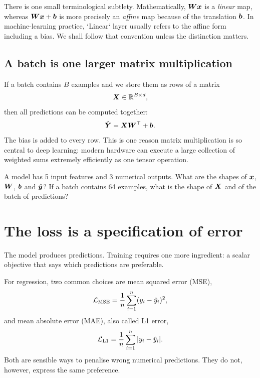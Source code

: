 There is one small terminological subtlety. Mathematically, \(\bm{W}\bm{x}\) is a \emph{linear} map, whereas \(\bm{W}\bm{x}+\bm{b}\) is more precisely an \emph{affine} map because of the translation \(\bm{b}\). In machine-learning practice, `Linear` layer usually refers to the affine form including a bias. We shall follow that convention unless the distinction matters.

\subsection{A batch is one larger matrix multiplication}

If a batch contains \(B\) examples and we store them as rows of a matrix
\[
  \bm{X}\in\mathbb{R}^{B\times d},
\]
then all predictions can be computed together:
\begin{equation}
  \hat{\bm{Y}} = \bm{X}\bm{W}^{\top}+\bm{b}.
  \label{eq:week2-batch-matmul}
\end{equation}
The bias is added to every row. This is one reason matrix multiplication is so central to deep learning: modern hardware can execute a large collection of weighted sums extremely efficiently as one tensor operation.

\begin{checkpointbox}
A model has 5 input features and 3 numerical outputs. What are the shapes of \(\bm{x}\), \(\bm{W}\), \(\bm{b}\) and \(\hat{\bm{y}}\)? If a batch contains 64 examples, what is the shape of \(\bm{X}\) and of the batch of predictions?
\end{checkpointbox}

\section{The loss is a specification of error}

The model produces predictions. Training requires one more ingredient: a scalar objective that says which predictions are preferable.

For regression, two common choices are mean squared error (MSE),
\begin{equation}
  \mathcal{L}_{\mathrm{MSE}}
  = \frac{1}{n}\sum_{i=1}^{n}(y_i-\hat y_i)^2,
  \label{eq:week2-mse}
\end{equation}
and mean absolute error (MAE), also called L1 error,
\begin{equation}
  \mathcal{L}_{\mathrm{L1}}
  = \frac{1}{n}\sum_{i=1}^{n}|y_i-\hat y_i|.
  \label{eq:week2-l1}
\end{equation}
Both are sensible ways to penalise wrong numerical predictions. They do not, however, express the same preference.

